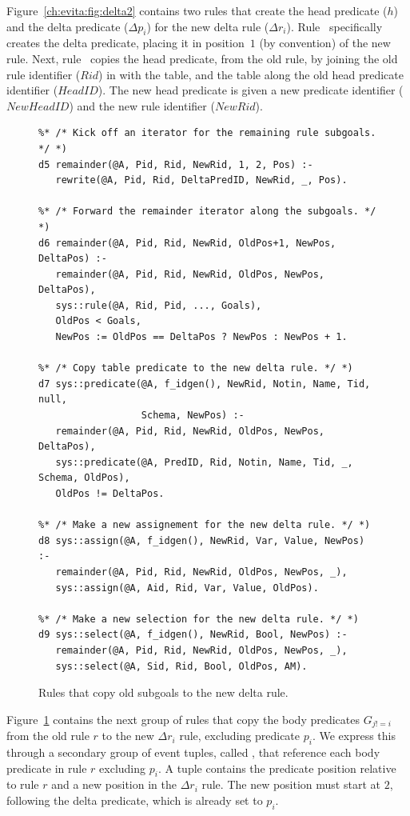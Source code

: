 Figure~\ref{ch:evita:fig:delta2} contains two rules that create the head
predicate ($h$) and the delta predicate ($\Delta p_i$) for the new delta rule
($\Delta r_i$).  Rule~ specifically creates the delta predicate, placing
it in position~$1$ (by convention) of the new rule.  Next, rule~ copies
the head predicate, from the old rule, by joining the old rule identifier
($Rid$) in  with the  table, and the  table
along the old head predicate identifier ($HeadID$).  The new head predicate is
given a new predicate identifier ($NewHeadID$) and the new rule identifier
($NewRid$).


\begin{figure}[!t]
\ssp
\centering
\begin{lstlisting}
%* /* Kick off an iterator for the remaining rule subgoals. */ *)
d5 remainder(@A, Pid, Rid, NewRid, 1, 2, Pos) :-
   rewrite(@A, Pid, Rid, DeltaPredID, NewRid, _, Pos).

%* /* Forward the remainder iterator along the subgoals. */ *)
d6 remainder(@A, Pid, Rid, NewRid, OldPos+1, NewPos, DeltaPos) :-
   remainder(@A, Pid, Rid, NewRid, OldPos, NewPos, DeltaPos),
   sys::rule(@A, Rid, Pid, ..., Goals),
   OldPos < Goals,
   NewPos := OldPos == DeltaPos ? NewPos : NewPos + 1.

%* /* Copy table predicate to the new delta rule. */ *)
d7 sys::predicate(@A, f_idgen(), NewRid, Notin, Name, Tid, null, 
                  Schema, NewPos) :-
   remainder(@A, Pid, Rid, NewRid, OldPos, NewPos, DeltaPos),
   sys::predicate(@A, PredID, Rid, Notin, Name, Tid, _, Schema, OldPos),
   OldPos != DeltaPos.

%* /* Make a new assignement for the new delta rule. */ *)
d8 sys::assign(@A, f_idgen(), NewRid, Var, Value, NewPos) :-
   remainder(@A, Pid, Rid, NewRid, OldPos, NewPos, _),
   sys::assign(@A, Aid, Rid, Var, Value, OldPos).

%* /* Make a new selection for the new delta rule. */ *)
d9 sys::select(@A, f_idgen(), NewRid, Bool, NewPos) :-
   remainder(@A, Pid, Rid, NewRid, OldPos, NewPos, _),
   sys::select(@A, Sid, Rid, Bool, OldPos, AM).

\end{lstlisting}
\caption{\label{ch:evita:fig:delta3}Rules that copy old subgoals to the new 
delta rule.}
\end{figure}

Figure~\ref{ch:evita:fig:delta3} contains the next group of rules that copy the
body predicates $G_{j!=i}$ from the old rule $r$ to the new $\Delta r_i$ rule,
excluding predicate $p_i$.  We express this through a secondary group of event
tuples, called , that reference each body predicate in rule $r$
excluding $p_i$.  A  tuple contains the predicate position
relative to rule $r$ and a new position in the $\Delta r_i$ rule.  The new
position must start at $2$, following the delta predicate, which is already set
to $p_i$.

